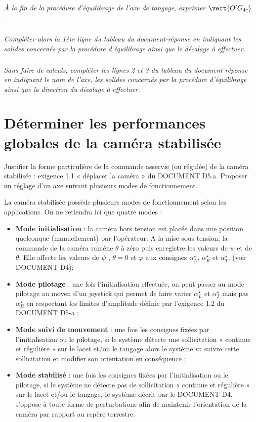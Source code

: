 \documentclass[10pt,fleqn]{article} %
\begin{document}
\subparagraph{\label{q20b}}\textit{À la fin de la procédure d’équilibrage de l’axe de tangage, exprimer $\vect{O'G_{4c}}$.}

\subparagraph{\label{q20c}}\textit{Compléter alors la 1ère ligne du tableau du document-réponse en indiquant les solides concernés par la procédure d’équilibrage ainsi que le décalage à effectuer.}%

\subparagraph{\label{q20d}}\textit{Sans faire de calculs, compléter les lignes 2 et 3 du tableau du document réponse en indiquant le nom de l’axe, les solides concernés par la procédure d’équilibrage ainsi que la direction du décalage à effectuer.}%

\section{Déterminer les performances globales de la caméra stabilisée}
\begin{obj}
Justifier la forme particulière de la commande asservie (ou régulée) de la caméra stabilisée : exigence 1.1 « déplacer la caméra » du DOCUMENT D5.a. Proposer un réglage d’un axe suivant plusieurs modes de fonctionnement.
\end{obj}

La caméra stabilisée possède plusieurs modes de fonctionnement selon les applications. On ne retiendra ici que quatre modes :
\begin{itemize}
\item \textbf{Mode initialisation} : la caméra hors tension est placée dans une position quelconque (manuellement) par l’opérateur. A la mise sous tension, la commande de la caméra ramène $\theta$ à zéro puis enregistre les valeurs de $\psi$ et de $\theta$. Elle affecte les valeurs de $\psi$ , $\theta=0$ et $\varphi$ aux consignes $\alpha_L^{\star}$, $\alpha_R^{\star}$ et $\alpha_T^{\star}$. (voir DOCUMENT D4);
\item \textbf{Mode pilotage} : une fois l’initialisation effectuée, on peut passer au mode pilotage au moyen d’un joystick 
qui permet de faire varier  $\alpha_L^{\star}$ et  $\alpha_T^{\star}$
mais pas $\alpha_R^{\star}$ en respectant 
les limites d’amplitude définie par l’exigence 1.2 du DOCUMENT D5-a ;
\item \textbf{Mode suivi de mouvement} : une fois les consignes fixées par l’initialisation ou le pilotage, si le système détecte une sollicitation « continue et régulière » sur le lacet et/ou le tangage alors le système va suivre cette sollicitation et modifier son orientation en conséquence ;
\item \textbf{Mode stabilisé} : une fois les consignes fixées par l’initialisation ou le pilotage, si le système ne détecte pas de sollicitation « continue et régulière » sur le lacet et/ou le tangage, le système décrit par le DOCUMENT D4, s’oppose à toute forme de perturbations afin de maintenir l’orientation de la caméra par rapport au repère terrestre.  
\end{itemize}
\end{document}
